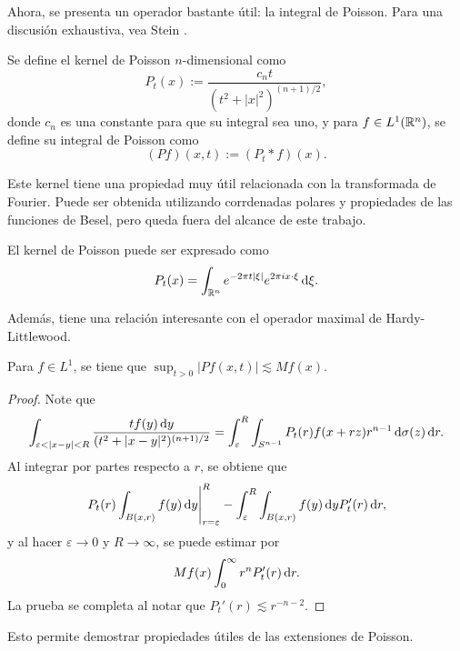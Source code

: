 Ahora, se presenta un operador bastante útil: la integral de Poisson. Para una discusión exhaustiva, vea Stein \cite{stein-singular}.
\begin{definition}
	Se define el kernel de Poisson  $n$-dimensional como 
	\begin{equation*}
		P_t(x) := \frac{c_nt}{(t^2+|x|^2)^{(n+1)/2}},
	\end{equation*}
	donde $c_n$ es una constante para que su integral sea uno, y para $f\in L^1(\mathbb{R}^n)$, se define su integral de Poisson como 
	\begin{equation*}
		(Pf)(x, t) := (P_t * f)(x).
	\end{equation*}
\end{definition}
Este kernel tiene una propiedad muy útil relacionada con la transformada de Fourier. Puede ser obtenida utilizando corrdenadas polares y propiedades de las funciones de Besel, pero queda fuera del alcance de este trabajo.
\begin{proposition}
	El kernel de Poisson puede ser expresado como
	\begin{equation*}
		P_t(x) = \int_{\mathbb{R}^n} e^{-2\pi t|\xi|} e^{2\pi i x\cdot\xi} \mathop{}\!\mathrm{d} \xi.
	\end{equation*}
\end{proposition}
 Además, tiene una relación interesante con el operador maximal de Hardy-Littlewood.
 \begin{theorem}
 	Para $f\in L^1$, se tiene que $\sup_{t>0}|Pf(x, t)| \lesssim Mf(x)$.
 \end{theorem}
 \begin{proof}
 	Note que 
 	\begin{equation*}
 		\int_{\varepsilon<|x-y|<R} \frac{tf(y)\diff y}{(t^2+|x-y|^2)^{(n+1)/2}} = \int_\varepsilon^R \int_{S^{n-1}}  P_t(r)f(x+rz)r^{n-1}\diff \sigma(z)\diff r.
 	\end{equation*}
 	Al integrar por partes respecto a $r$, se obtiene que 
 	\begin{equation*}
 		\left. P_t(r)\int_{B(x, r)}f(y)\mathop{}\!\mathrm{d} y\right\vert_{r=\varepsilon}^R - \int_\varepsilon^R \int_{B(x, r)}f(y)\mathop{}\!\mathrm{d} y P_t'(r) \mathop{}\!\mathrm{d} r,
 	\end{equation*} 
 	y al hacer $\varepsilon\to0$ y $R\to\infty$, se puede estimar por
 	\begin{equation*}
 		Mf(x)\int_0^\infty r^n P_t'(r)\mathop{}\!\mathrm{d} r .
 	\end{equation*}
 	La prueba se completa al notar que $P_t'(r) \lesssim r^{-n-2}$.
 \end{proof}
Esto permite demostrar propiedades útiles de las extensiones de Poisson.
